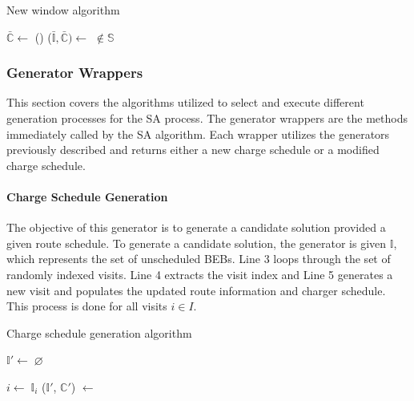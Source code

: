 \documentclass[11pt,a4paper,final]{article}
\newcommand{\I}{\mathbb{I}}                 %
\newcommand{\C}{\mathbb{C}}                 %
\newcommand{\U}{\mathcal{U}}                %
\newcommand{\Sol}{\mathbb{S}}               %
\newcommand{\Iset}{I}                       %
\begin{document}
\begin{algorithm}[H]
  \caption{New window algorithm} \label{alg:new-window}
  \LinesNumbered
  \KwIn{$\Sol$}
  \KwOut{$\Sol'$}


  \Begin
  {
    $\bar{\C} \leftarrow$\Purge{$\Sol$}
    \If() {($\bar{\I}, \bar{\C}) \leftarrow$ \NewVisit{$\Sol'$} $\not\in \Sol$}
    {
      \Return{($\bar{\I}, \bar{\C}$)} 
    }

    \Return{($\varnothing$)}
  }
\end{algorithm}

\subsubsection{Generator Wrappers}
\label{sec:generator-wrappers}
This section covers the algorithms utilized to select and execute different generation processes for the SA process. The
generator wrappers are the methods immediately called by the SA algorithm. Each wrapper utilizes the generators
previously described and returns either a new charge schedule or a modified charge schedule.

\paragraph{Charge Schedule Generation}
\label{sec:charge-schedule-generation}
The objective of this generator is to generate a candidate solution provided a given route schedule. To generate a
candidate solution, the generator is given \(\I\), which represents the set of unscheduled BEBs. Line 3 loops through the
set of randomly indexed visits. Line 4 extracts the visit index and Line 5 generates a new visit and populates the
updated route information and charger schedule. This process is done for all visits \(i \in \Iset\).

\begin{algorithm}[H]
\caption{Charge schedule generation algorithm} \label{alg:charge-schedule-generation}
    \LinesNumbered
    \KwIn{$\I$, $\C$}
    \KwOut{$\I'$, $\C'$}


    \Begin
    {
        $\I' \leftarrow \; \varnothing$

        \ForEach {$\I_i \in \{\ \U_{\I} \}$}
        {
            $i\leftarrow\; \I_i$
            ($\I'$, $\C'$) $\leftarrow$ \NewVisit{($i$, $\I$, $\C$)}
        }
            \Return{($\I'$, $\C'$)}
    }
\end{algorithm}
\end{document}
